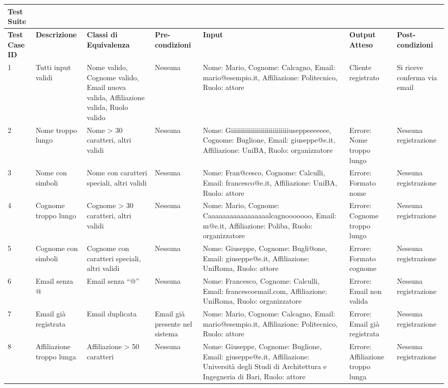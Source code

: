 \begin{tabular}{|p{2cm}|p{2cm}|p{2cm}|p{2cm}|p{4cm}|p{3cm}|p{2cm}|}
\hline
\rowcolor{SkyBlue}
\textbf{Test Suite} & & & & & &\\
\hline
\rowcolor{Red}
\textbf{Test Case ID} & \textbf{Descrizione} & \textbf{Classi di Equivalenza} & \textbf{Pre-condizioni} & \textbf{Input} & \textbf{Output Atteso} & \textbf{Post-condizioni} \\
\hline
1 & Tutti input validi & Nome valido, Cognome valido, Email nuova valida, Affiliazione valida, Ruolo valido & Nessuna & Nome: Mario, Cognome: Calcagno, Email: mario@esempio.it, Affiliazione: Politecnico, Ruolo: attore & Cliente registrato & Si riceve conferma via email \\
\hline
2 & Nome troppo lungo & Nome > 30 caratteri, altri validi & Nessuna & Nome: Giiiiiiiiiiiiiiiiiiiiiiiiiiiiiuseppeeeeeee, Cognome: Buglione, Email: giuseppe@e.it, Affiliazione: UniBA, Ruolo: organizzatore & Errore: Nome troppo lungo & Nessuna registrazione \\
\hline
3 & Nome con simboli & Nome con caratteri speciali, altri validi & Nessuna & Nome: Fran@cesco, Cognome: Calculli, Email: francesco@e.it, Affiliazione: UniBA, Ruolo: attore & Errore: Formato nome & Nessuna registrazione \\
\hline
4 & Cognome troppo lungo & Cognome > 30 caratteri, altri validi & Nessuna & Nome: Mario, Cognome: Caaaaaaaaaaaaaaaaalcagnooooooo, Email: m@e.it, Affiliazione: Poliba, Ruolo: organizzatore & Errore: Cognome troppo lungo & Nessuna registrazione \\
\hline
5 & Cognome con simboli & Cognome con caratteri speciali, altri validi & Nessuna & Nome: Giuseppe, Cognome: Bugli@one, Email: giuseppe@e.it, Affiliazione: UniRoma, Ruolo: attore & Errore: Formato cognome & Nessuna registrazione \\
\hline
6 & Email senza @ & Email senza “@” & Nessuna & Nome: Francesco, Cognome: Calculli, Email: francescoemail.com, Affiliazione: UniRoma, Ruolo: organizzatore & Errore: Email non valida & Nessuna registrazione \\
\hline
7 & Email già registrata & Email duplicata & Email già presente nel sistema & Nome: Mario, Cognome: Calcagno, Email: mario@esempio.it, Affiliazione: Politecnico, Ruolo: attore & Errore: Email già registrata & Nessuna registrazione \\
\hline
8 & Affiliazione troppo lunga & Affiliazione > 50 caratteri & Nessuna & Nome: Giuseppe, Cognome: Buglione, Email: giuseppe@e.it, Affiliazione: Università degli Studi di Architettura e Ingegneria di Bari, Ruolo: attore & Errore: Affiliazione troppo lunga & Nessuna registrazione \\

\end{tabular}
